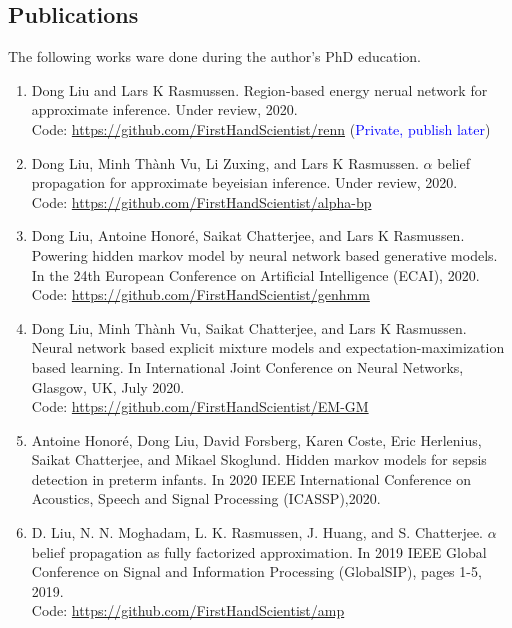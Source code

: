 \subsection{Publications}
The following works ware done during the author's PhD education.
\begin{enumerate}
\item Dong Liu and Lars K Rasmussen. Region-based energy nerual network for approximate
  inference. Under review, 2020. \\
  Code: \href{https://github.com/FirstHandScientist/renn}{https://github.com/FirstHandScientist/renn} (\textcolor{blue}{Private, publish later})
\item Dong Liu, Minh Th\`{a}nh Vu, Li Zuxing, and Lars K Rasmussen. $\alpha$ belief propagation for approximate beyeisian inference. Under review, 2020.\\
  Code: \href{https://github.com/FirstHandScientist/alpha-bp}{https://github.com/FirstHandScientist/alpha-bp}

\item Dong Liu, Antoine Honor{\'e}, Saikat Chatterjee, and Lars K Rasmussen. Powering hidden
  markov model by neural network based generative models. In the 24th European Conference on Artificial Intelligence (ECAI), 2020.\\
  Code: \href{https://github.com/FirstHandScientist/genhmm}{https://github.com/FirstHandScientist/genhmm}

\item Dong Liu, Minh Th\`{a}nh Vu, Saikat Chatterjee, and Lars K Rasmussen. Neural network based explicit mixture models and expectation-maximization based learning. In International Joint Conference on Neural Networks, Glasgow, UK, July 2020. \\
  Code: \href{https://github.com/FirstHandScientist/EM-GM}{https://github.com/FirstHandScientist/EM-GM}

\item Antoine Honor{\'e}, Dong Liu, David Forsberg, Karen Coste, Eric Herlenius, Saikat Chatterjee, and Mikael Skoglund. Hidden markov models for sepsis detection in preterm infants. In 2020 IEEE International Conference on Acoustics, Speech and Signal Processing (ICASSP),2020.

\item D. Liu, N. N. Moghadam, L. K. Rasmussen, J. Huang, and S. Chatterjee. $\alpha$ belief propagation as fully factorized approximation. In 2019 IEEE Global Conference on Signal and Information Processing (GlobalSIP), pages 1-5, 2019.\\
  Code: \href{https://github.com/FirstHandScientist/amp}{https://github.com/FirstHandScientist/amp}


\end{enumerate}
